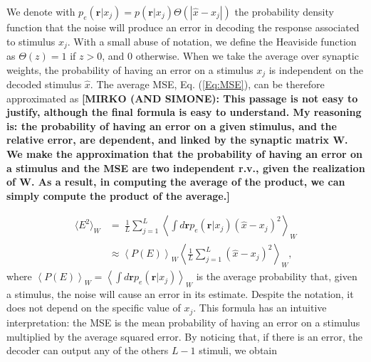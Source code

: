 \documentclass[a4paper]{article}%
\begin{document}
We denote with $p_{e}(\mathbf{r}|x_{j}) = p(\mathbf{r}|x_{j})\Theta\left(
|\hat{x}-x_{j}|\right)  $ the probability density function that the noise will
produce an error in decoding the response associated to stimulus $x_{j}$. With
a small abuse of notation, we define the Heaviside function as $\Theta(z) = 1$
if $z>0$, and 0 otherwise. When we take the average over synaptic weights, the
probability of having an error on a stimulus $x_{j}$ is independent on the
decoded stimulus $\hat{x}$. The average MSE, Eq. (\ref{Eq:MSE}), can be
therefore approximated as \textbf{[MIRKO (AND SIMONE): This passage is not easy to justify, although the final formula is easy to understand. My reasoning is: the probability of having an error on a given stimulus, and the relative error, are dependent, and linked by the synaptic matrix W. We make the approximation that the probability of having an error on a stimulus and the MSE are two independent r.v., given the realization of W. As a result, in computing the average of the product, we can simply compute the product of the average.]}

\begin{equation}%
\begin{split}
\langle E^{2} \rangle_{W}  &  = \ \frac{1}{L}\sum_{j=1}^{L}\left\langle \int
d\mathbf{r} p_{e}(\mathbf{r}|x_{j}) \left(  \hat{x}-x_{j} \right)
^{2}\right\rangle _{W}\\
&  \approx\left\langle P(E)\right\rangle _{W} \left\langle \frac{1}{L}%
\sum_{j=1}^{L} (\hat{x}-x_{j})^{2}\right\rangle _{W},\label{Eq:PE}%
\end{split}
\end{equation}
where $\left\langle P(E)\right\rangle _{W} = \left\langle \int d\mathbf{r}
p_{e}(\mathbf{r}|x_{j})\right\rangle _{W}$ is the average probability that,
given a stimulus, the noise will cause an error in its estimate. Despite the
notation, it does not depend on the specific value of $x_{j}$. This formula
has an intuitive interpretation: the MSE is the mean probability of having an
error on a stimulus multiplied by the average squared error. By noticing that,
if there is an error, the decoder can output any of the others $L-1$ stimuli,
we obtain
\end{document}
